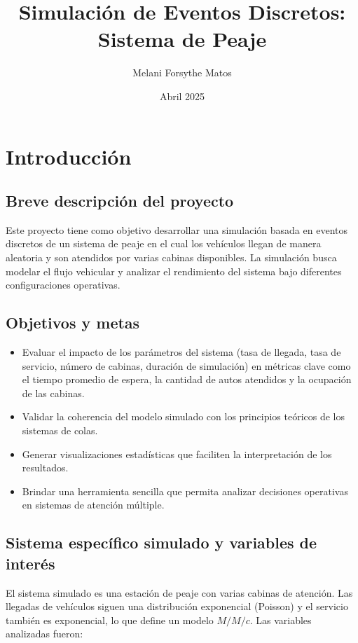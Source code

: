 \documentclass[12pt]{article}
\title{Simulación de Eventos Discretos: Sistema de Peaje}
\author{Melani Forsythe Matos}
\date{Abril 2025}
\begin{document}
\setlength{\pdfpageheight}{\paperheight}
\setlength{\pdfpagewidth}{\paperwidth}
\clearpage

\maketitle


\section{Introducción}

\subsection*{Breve descripción del proyecto}
Este proyecto tiene como objetivo desarrollar una simulación basada en eventos discretos de un sistema de peaje en el cual los vehículos llegan de manera aleatoria y son atendidos por varias cabinas disponibles. La simulación busca modelar el flujo vehicular y analizar el rendimiento del sistema bajo diferentes configuraciones operativas.

\subsection*{Objetivos y metas}
\begin{itemize}
    \item Evaluar el impacto de los parámetros del sistema (tasa de llegada, tasa de servicio, número de cabinas, duración de simulación) en métricas clave como el tiempo promedio de espera, la cantidad de autos atendidos y la ocupación de las cabinas.
    \item Validar la coherencia del modelo simulado con los principios teóricos de los sistemas de colas.
    \item Generar visualizaciones estadísticas que faciliten la interpretación de los resultados.
    \item Brindar una herramienta sencilla que permita analizar decisiones operativas en sistemas de atención múltiple.
\end{itemize}

\subsection*{Sistema específico simulado y variables de interés}
El sistema simulado es una estación de peaje con varias cabinas de atención. Las llegadas de vehículos siguen una distribución exponencial (Poisson) y el servicio también es exponencial, lo que define un modelo $M/M/c$. Las variables analizadas fueron:
\end{document}
